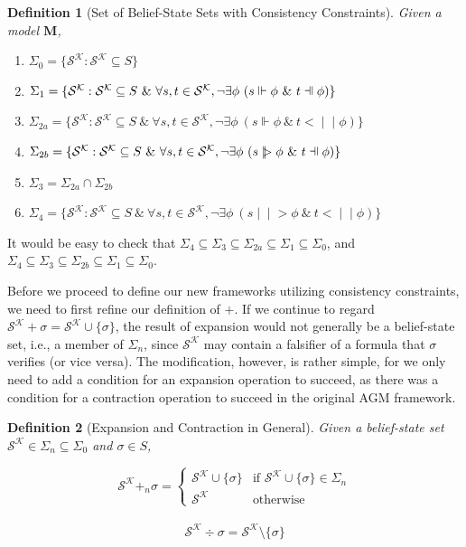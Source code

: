 \documentclass[12pt]{article}
\newtheorem{definition}{Definition}[section]
\newcommand{\fal}{\mathrel{\text{\reflectbox{$\Vdash$}}}}
\newcommand{\ver}{\Vdash}
\newcommand{\inever}{\mid \! \mid \!\!>}
\newcommand{\inefal}{< \! \! \mid \! \mid}
\newcommand{\SK}{\mathcal{S}^\mathcal{K}}
\begin{document}
\begin{definition}[Set of Belief-State Sets with Consistency Constraints]
    Given a model $\bm{M}$, 
    \begin{enumerate}
        \item[\emph{(0)}] $\Sigma_0 = \{\SK : \SK \subseteq S \}$
        \item[\emph{(1)}] $\Sigma_1 = \{\SK : \SK \subseteq S \ \& \ \forall s, t \in \SK, \lnot \exists \phi \ (s \ver \phi \ \& \  t \fal \phi) \}$
        \item[\emph{(2a)}] $\Sigma_{2a} = \{\SK : \SK \subseteq S \ \& \ \forall s, t \in \SK, \lnot \exists \phi \ (s \ver \phi \ \& \  t \inefal \phi) \}$
        \item[\emph{(2b)}] $\Sigma_{2b} = \{\SK : \SK \subseteq S \ \& \ \forall s, t \in \SK, \lnot \exists \phi \ (s \inever \phi \ \& \  t \fal \phi) \}$
        \item[\emph{(3)}] $\Sigma_3 = \Sigma_{2a} \cap \Sigma_{2b}$
        \item[\emph{(4)}] $\Sigma_4 = \{\SK : \SK \subseteq S \ \& \ \forall s, t \in \SK, \lnot \exists \phi \ (s \inever \phi \ \& \  t \inefal \phi) \}$
    \end{enumerate}
\end{definition}
It would be easy to check that $\Sigma_4 \subseteq \Sigma_3 \subseteq \Sigma_{2a} \subseteq \Sigma_1 \subseteq \Sigma_0$, and $\Sigma_4 \subseteq \Sigma_3 \subseteq \Sigma_{2b} \subseteq \Sigma_1 \subseteq \Sigma_0$. 
\par
Before we proceed to define our new frameworks utilizing consistency constraints, we need to first refine our definition of $+$. If we continue to regard $\SK + \sigma = \SK \cup \{\sigma\}$, the result of expansion would not generally be a belief-state set, i.e., a member of $\Sigma_n$, since $\SK$ may contain a falsifier of a formula that $\sigma$ verifies (or vice versa). The modification, however, is rather simple, for we only need to add a condition for an expansion operation to succeed, as there was a condition for a contraction operation to succeed in the original AGM framework.
\begin{definition}[Expansion and Contraction in General]
    Given a belief-state set $\SK \in \Sigma_n \subseteq \Sigma_0$ and $\sigma \in S$, 
\par
\[
    \SK +_n \sigma = \begin{cases}
        \SK \cup \{\sigma\} & \text{if } \SK \cup \{\sigma\} \in \Sigma_n \\
        \SK & \text{otherwise}
    \end{cases}\]
    \\
    \[\SK \div \sigma = \SK \setminus \{\sigma\}
\]
\end{definition}
\end{document}
